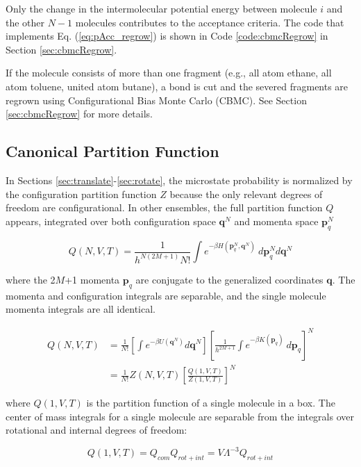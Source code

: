 Only the change in the intermolecular potential energy between molecule $i$ and the other $N-1$ molecules contributes to the acceptance criteria. The code that implements Eq. (\ref{eq:pAcc_regrow}) is shown in Code \ref{code:cbmcRegrow} in Section \ref{sec:cbmcRegrow}.

If the molecule consists of more than one fragment (e.g., all atom ethane, all atom toluene, united atom butane), a bond is cut and the severed fragments are regrown using Configurational Bias Monte Carlo (CBMC). See Section \ref{sec:cbmcRegrow} for more details.

\subsection{Canonical Partition Function}
In Sections \ref{sec:translate}-\ref{sec:rotate}, the microstate probability is normalized by the configuration partition function $Z$ because the only relevant degrees of freedom are configurational. In other ensembles, the full partition function $Q$ appears, integrated over both configuration space $\mathbf{q}^N$ and momenta space $\mathbf{p}_q^N$

\begin{equation}
\label{eq:partitionFn_NVT}
Q(N,V,T) = \frac{1}{h^{N(2M+1)} N!} \int e^{-\beta H(\mathbf{p}_q^N, \mathbf{q}^N)}\ d\mathbf{p}_q^N d\mathbf{q}^N
\end{equation}

where the 2$M$+1 momenta $\mathbf{p}_q$ are conjugate to the generalized coordinates $\mathbf{q}$. The momenta and configuration integrals are separable, and the single molecule momenta integrals are all identical.

\begin{align}
Q(N,V,T) &= \frac{1}{N!} \left[\int e^{-\beta U(\mathbf{q}^N)} d\mathbf{q}^N \right] \left[\frac{1}{h^{2M+1}} \int e^{-\beta K(\mathbf{p}_q)}\ d\mathbf{p}_q \right]^N \nonumber \\
&= \frac{1}{N!} Z(N,V,T) \left[\frac{Q(1,V,T)}{Z(1,V,T)}\right]^N
\end{align}

where $Q(1,V,T)$ is the partition function of a single molecule in a box. The center of mass integrals for a single molecule are separable from the integrals over rotational and internal degrees of freedom:

\begin{equation}
\label{eq:partitionFn_1VT}
Q(1,V,T) = Q_{com}Q_{rot+int} = V \Lambda^{-3} Q_{rot+int}
\end{equation}

